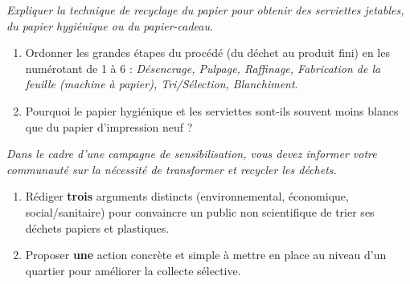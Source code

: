 \documentclass[11pt]{article}
\begin{document}
\begin{exercice}
\emph{Expliquer la technique de recyclage du papier pour obtenir des serviettes jetables, du papier hygiénique ou du papier-cadeau.}
\begin{enumerate}
    \item Ordonner les grandes étapes du procédé (du déchet au produit fini) en les numérotant de 1 à 6 : \textit{Désencrage, Pulpage, Raffinage, Fabrication de la feuille (machine à papier), Tri/Sélection, Blanchiment}.
    \item Pourquoi le papier hygiénique et les serviettes sont-ils souvent moins blancs que du papier d'impression neuf ?
\end{enumerate}
\end{exercice}

\begin{exercice}
\emph{Dans le cadre d'une campagne de sensibilisation, vous devez informer votre communauté sur la nécessité de transformer et recycler les déchets.}
\begin{enumerate}
    \item Rédiger \textbf{trois} arguments distincts (environnemental, économique, social/sanitaire) pour convaincre un public non scientifique de trier ses déchets papiers et plastiques.
    \item Proposer \textbf{une} action concrète et simple à mettre en place au niveau d'un quartier pour améliorer la collecte sélective.
\end{enumerate}
\end{exercice}
\end{document}
